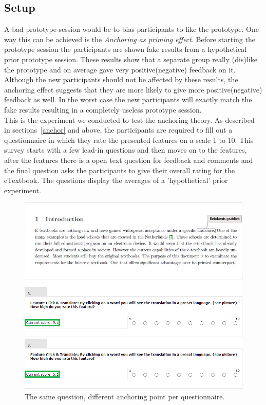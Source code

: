 \documentclass[main.tex]{subfiles}
\begin{document}
\label{exp:anchor}

\subsection{Setup}

A bad prototype session would be to bias participants to like the prototype. One way this can be achieved is the \emph{Anchoring as priming effect}. Before starting the prototype session the participants are shown fake results from a hypothetical prior prototype session. These results show that a separate group really (dis)like the prototype and on average gave very positive(negative) feedback on it. Although the new participants should not be affected by these results, the anchoring effect suggests that they are more likely to give more positive(negative) feedback as well. In the worst case the new participants will exactly match the fake results resulting in a completely useless prototype session.\\

This is the experiment we conducted to test the anchoring theory. As described in sections~\ref{anchor} and above, the participants are required to fill out a questionnaire in which they rate the presented features on a scale 1 to 10. This survey starts with a few lead-in questions and then moves on to the features, after the features there is a open text question for feedback and comments and the final question asks the participants to give their overall rating for the eTextbook. The questions display the averages of a 'hypothetical' prior experiment.  \\

\begin{figure}
\includegraphics[width=1\textwidth]{QuestionComparison.png}
\caption{The same question, different anchoring point per questionnaire.}
\label{fig:qComp}
\end{figure}
\end{document}
